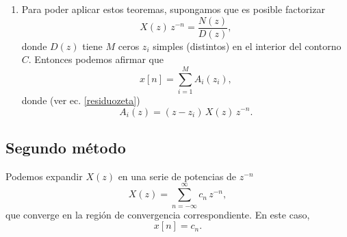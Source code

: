 \begin{enumerate}
\begin{enumerate}
            \item El segundo teorema de Cauchy afirma que
               \begin{equation}
                  \frac{1}{2 \, \pi \, j} \oint_{C} \frac{f(z)}{g(z)} \, dz = 
                  \sum_{i=1}^{n} A_{i}(z_{i})
               \end{equation}
               donde
               \begin{equation}
                  A_{i}(z) = (z-z_{i}) \, \frac{f(z)}{g(z)}. \label{residuozeta}
               \end{equation}
               son los residuos de $\frac{f(z)}{g(z)}$ evaluados en los polos $z_{i}$,
               si se cumplen las siguientes condiciones
               \begin{enumerate}
                  \item $f(z)$ se mantiene acotada en el interior del contorno $C$.
                  \item $g(z)$ es un polinomio con $N$ ra\'{\i}ces simples (o sea, distintas) $z_{i}$, 
                        $i \in [1,N]$  en el interior del contorno $C$.
               \end{enumerate}
          \end{enumerate}

         \item  Para poder aplicar estos teoremas, supongamos que es posible factorizar
           \begin{equation}
             X(z) \, z^{-n} = \frac{N(z)}{D(z)},
           \end{equation}
           donde $D(z)$ tiene $M$ ceros $z_{i}$ simples (distintos) en el interior del contorno $C$. 
           Entonces podemos afirmar que
           \begin{equation}
              x[n] = \sum_{i=1}^{M} A_{i}(z_{i}),
           \end{equation}
           donde (ver ec. \ref{residuozeta})
           \begin{equation}
               A_{i}(z) = (z-z_{i}) \, X(z) \, z^{-n}.
           \end{equation}

\end{enumerate}

\subsection{Segundo m\'{e}todo}

Podemos expandir $X(z)$ en una serie de potencias de $z^{-n}$
\begin{equation}
  X(z) = \sum_{n=-\infty}^{\infty} c_{n} \, z^{-n},
\end{equation}
que converge en la regi\'{o}n de convergencia correspondiente. En este caso, 
\begin{equation} x[n] = c_{n}.
\end{equation}

